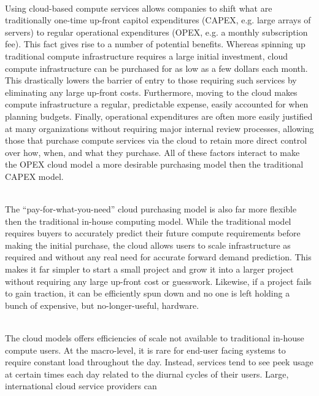 \begin{packed_desc}
\item[OPEX vs CAPEX] \hfill \\ Using cloud-based compute services
  allows companies to shift what are traditionally one-time up-front
  capitol expenditures (CAPEX, e.g. large arrays of servers) to
  regular operational expenditures (OPEX, e.g. a monthly subscription
  fee). This fact gives rise to a number of potential
  benefits. Whereas spinning up traditional compute infrastructure
  requires a large initial investment, cloud compute infrastructure
  can be purchased for as low as a few dollars each month. This
  drastically lowers the barrier of entry to those requiring such
  services by eliminating any large up-front costs. Furthermore,
  moving to the cloud makes compute infrastructure a regular,
  predictable expense, easily accounted for when planning
  budgets. Finally, operational expenditures are often more easily
  justified at many organizations without requiring major internal
  review processes, allowing those that purchase compute services via
  the cloud to retain more direct control over how, when, and what
  they purchase. All of these factors interact to make the OPEX cloud
  model a more desirable purchasing model then the traditional CAPEX
  model.
\item[Flexibility] \hfill \\ The ``pay-for-what-you-need'' cloud
  purchasing model is also far more flexible then the traditional
  in-house computing model. While the traditional model requires
  buyers to accurately predict their future compute requirements
  before making the initial purchase, the cloud allows users to scale
  infrastructure as required and without any real need for accurate
  forward demand prediction. This makes it far simpler to start a
  small project and grow it into a larger project without requiring
  any large up-front cost or guesswork. Likewise, if a project fails
  to gain traction, it can be efficiently spun down and no one is left
  holding a bunch of expensive, but no-longer-useful, hardware.
\item[Efficiency] \hfill \\ The cloud models offers efficiencies of
  scale not available to traditional in-house compute users. At the
  macro-level, it is rare for end-user facing systems to require
  constant load throughout the day. Instead, services tend to see peek
  usage at certain times each day related to the diurnal cycles of
  their users. Large, international cloud service providers can

\end{packed_desc}
